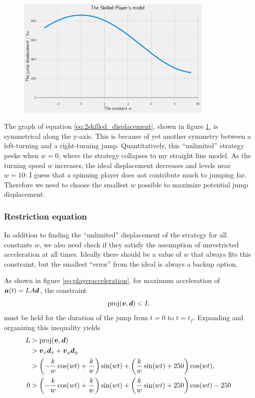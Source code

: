 \begin{figure}[H]
    \centering
    \includegraphics[width=0.85\textwidth]{assets/skilled_displacement.png}
    \caption{}
    \label{fig:skilled_displacement}

\end{figure}
The graph of equation \ref{eq:2skilled_displacement}, shown in figure \ref{fig:skilled_displacement}, is symmetrical along the y-axis. This is because of yet another symmetry between a left-turning and a right-turning jump. Quantitatively, this ``unlimited'' strategy peeks when $w=0$, where the strategy collapses to my straight line model. As the turning speed $w$ increases, the ideal displacement decreases and levels near $w=10$: I guess that a spinning player does not contribute much to jumping far. Therefore we need to choose the smallest $w$ possible to maximize potential jump displacement.

\subsubsection{Restriction equation}
In addition to finding the ``unlimited'' displacement of the strategy for all constants $w$, we also need check if they satisfy the assumption of unrestricted acceleration at all times. Ideally there should be a value of $w$ that always fits this constraint, but the smallest ``error'' from the ideal is always a backup option.

As shown in figure \ref{eq:playeracceleration}, for maximum acceleration of $\boldsymbol{a}(t) = LA\boldsymbol{d}$, the constraint
\[
    \text{proj}(\boldsymbol{v}, \boldsymbol{d}) < L
\]
must be held for the duration of the jump from $t=0$ to $t=t_f$. Expanding and organizing this inequality yields
\begin{align*}
    L &> \text{proj}(\boldsymbol{v}, \boldsymbol{d})\\
    &> \boldsymbol{v}_x \boldsymbol{d}_x + \boldsymbol{v}_y \boldsymbol{d}_y\\
    &> \left(-\frac{k}{w} \cos(wt) + \frac{k}{w}\right) \sin(wt) + \left(\frac{k}{w} \sin(wt) + 250\right) \cos(wt),\\
    0 &> \left(-\frac{k}{w} \cos(wt) + \frac{k}{w}\right) \sin(wt) + \left(\frac{k}{w} \sin(wt) + 250\right) \cos(wt) - 250
\end{align*}

